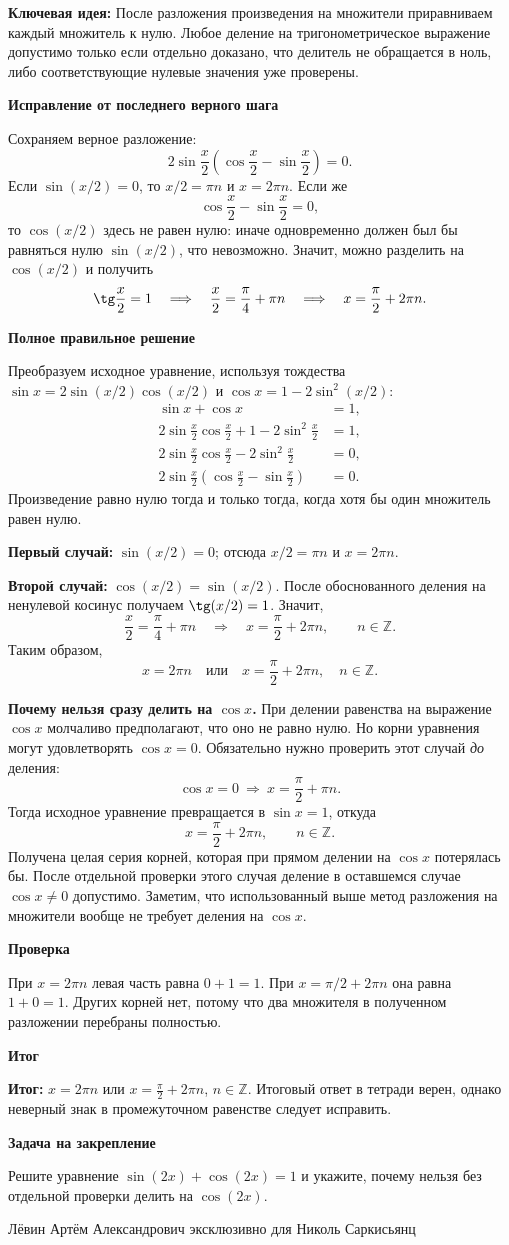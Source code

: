 \documentclass[12pt,a4paper]{article}
\newcommand{\heading}[1]{\par\vspace{4pt}\textbf{#1}\par}
\newcommand{\idea}{\textcolor{blue!60!black}{\textbf{Ключевая идея:}}}
\newcommand{\result}{\textcolor{teal!60!black}{\textbf{Итог:}}}
\begin{document}
\idea{} После разложения произведения на множители приравниваем каждый множитель к нулю. Любое деление на тригонометрическое выражение допустимо только если отдельно доказано, что делитель не обращается в ноль, либо соответствующие нулевые значения уже проверены.
\heading{Исправление от последнего верного шага}
Сохраняем верное разложение:
\[
2\sin\frac x2\left(\cos\frac x2-\sin\frac x2\right)=0.
\]
Если $\sin(x/2)=0$, то $x/2=\pi n$ и $x=2\pi n$. Если же
\[
\cos\frac x2-\sin\frac x2=0,
\]
то $\cos(x/2)$ здесь не равен нулю: иначе одновременно должен был бы равняться нулю $\sin(x/2)$, что невозможно. Значит, можно разделить на $\cos(x/2)$ и получить
\[
\tg\frac x2=1
\quad\Longrightarrow\quad
\frac x2=\frac\pi4+\pi n
\quad\Longrightarrow\quad
x=\frac\pi2+2\pi n.
\]
\heading{Полное правильное решение}
Преобразуем исходное уравнение, используя тождества
$\sin x=2\sin(x/2)\cos(x/2)$ и
$\cos x=1-2\sin^2(x/2)$:
\begin{align*}
\sin x+\cos x&=1,\\
2\sin\frac x2\cos\frac x2+1-2\sin^2\frac x2&=1,\\
2\sin\frac x2\cos\frac x2-2\sin^2\frac x2&=0,\\
2\sin\frac x2\left(\cos\frac x2-\sin\frac x2\right)&=0.
\end{align*}
Произведение равно нулю тогда и только тогда, когда хотя бы один множитель равен нулю.

\textbf{Первый случай:} $\sin(x/2)=0$; отсюда $x/2=\pi n$ и $x=2\pi n$.

\textbf{Второй случай:} $\cos(x/2)=\sin(x/2)$. После обоснованного деления на ненулевой косинус получаем $\tg(x/2)=1$. Значит,
\[
\frac x2=\frac\pi4+\pi n
\quad\Longrightarrow\quad
x=\frac\pi2+2\pi n,\qquad n\in\mathbb Z.
\]
Таким образом,
\[
\boxed{x=2\pi n\quad\text{или}\quad x=\frac\pi2+2\pi n},
\quad n\in\mathbb Z.
\]

\textbf{Почему нельзя сразу делить на $\cos x$.} При делении равенства на выражение $\cos x$ молчаливо предполагают, что оно не равно нулю. Но корни уравнения могут удовлетворять $\cos x=0$. Обязательно нужно проверить этот случай \emph{до} деления:
\[
\cos x=0\ \Longrightarrow\ x=\frac\pi2+\pi n.
\]
Тогда исходное уравнение превращается в $\sin x=1$, откуда
\[
x=\frac\pi2+2\pi n,\qquad n\in\mathbb Z.
\]
Получена целая серия корней, которая при прямом делении на $\cos x$ потерялась бы. После отдельной проверки этого случая деление в оставшемся случае $\cos x\ne0$ допустимо. Заметим, что использованный выше метод разложения на множители вообще не требует деления на $\cos x$.
\heading{Проверка}
При $x=2\pi n$ левая часть равна $0+1=1$. При $x=\pi/2+2\pi n$ она равна $1+0=1$. Других корней нет, потому что два множителя в полученном разложении перебраны полностью.
\heading{Итог}
\result{} $\displaystyle x=2\pi n$ или $\displaystyle x=\frac\pi2+2\pi n$, $n\in\mathbb Z$. Итоговый ответ в тетради верен, однако неверный знак в промежуточном равенстве следует исправить.
\heading{Задача на закрепление}
Решите уравнение $\sin(2x)+\cos(2x)=1$ и укажите, почему нельзя без отдельной проверки делить на $\cos(2x)$.
\vfill
\begin{center}\small Лёвин Артём Александрович эксклюзивно для Николь Саркисьянц\end{center}
\end{document}
